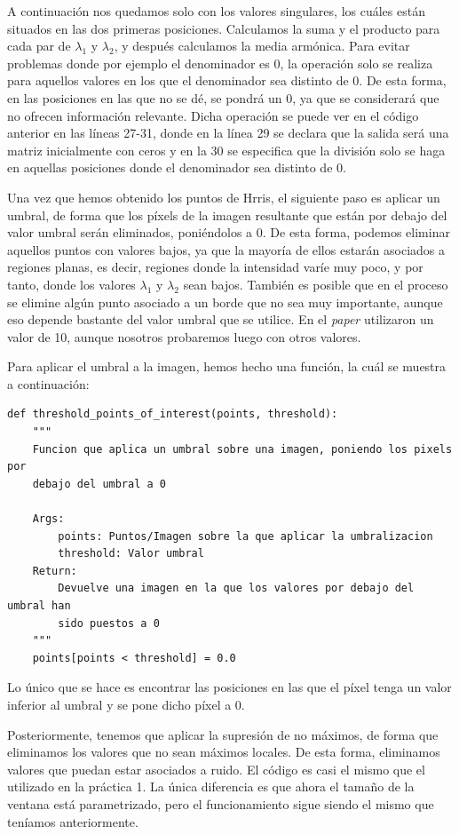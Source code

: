 \documentclass[11pt,a4paper]{article}
\begin{document}
A continuación nos quedamos solo con los valores singulares, los cuáles están situados en
las dos primeras posiciones. Calculamos la suma y el producto para cada par de $\lambda_1$
y $\lambda_2$, y después calculamos la media armónica. Para evitar problemas donde por
ejemplo el denominador es 0, la operación solo se realiza para aquellos valores en los que
el denominador sea distinto de 0. De esta forma, en las posiciones en las que no se dé,
se pondrá un 0, ya que se considerará que no ofrecen información relevante. Dicha operación
se puede ver en el código anterior en las líneas 27-31, donde en la línea 29 se declara que
la salida será una matriz inicialmente con ceros y en la 30 se especifica que la división solo se
haga en aquellas posiciones donde el denominador sea distinto de 0.

Una vez que hemos obtenido los puntos de Hrris, el siguiente paso es aplicar un umbral,
de forma que los píxels de la imagen resultante que están por debajo del valor umbral serán
eliminados, poniéndolos a 0. De esta forma, podemos eliminar aquellos puntos con valores
bajos, ya que la mayoría de ellos
estarán asociados a regiones planas, es decir, regiones donde la intensidad varíe muy poco,
y por tanto, donde los valores $\lambda_1$ y $\lambda_2$ sean bajos.
También es posible que en el proceso se elimine algún punto asociado a un borde que no sea muy importante,
aunque eso depende bastante del valor umbral que se utilice. En el \textit{paper} utilizaron un valor de
10, aunque nosotros probaremos luego con otros valores.

Para aplicar el umbral a la imagen, hemos hecho una función, la cuál se muestra a continuación:

\begin{lstlisting}
def threshold_points_of_interest(points, threshold):
    """
    Funcion que aplica un umbral sobre una imagen, poniendo los pixels por
    debajo del umbral a 0

    Args:
        points: Puntos/Imagen sobre la que aplicar la umbralizacion
        threshold: Valor umbral
    Return:
        Devuelve una imagen en la que los valores por debajo del umbral han
        sido puestos a 0
    """
    points[points < threshold] = 0.0
\end{lstlisting}

Lo único que se hace es encontrar las posiciones en las que el píxel tenga un valor inferior al umbral
y se pone dicho píxel a 0.

Posteriormente, tenemos que aplicar la supresión de no máximos, de forma que
eliminamos los valores que no sean máximos locales. De esta forma, eliminamos
valores que puedan estar asociados a ruido. El código es casi el mismo
que el utilizado en la práctica 1. La única diferencia es que ahora el tamaño de la
ventana está parametrizado, pero el funcionamiento sigue siendo el mismo que teníamos
anteriormente.
\end{document}

